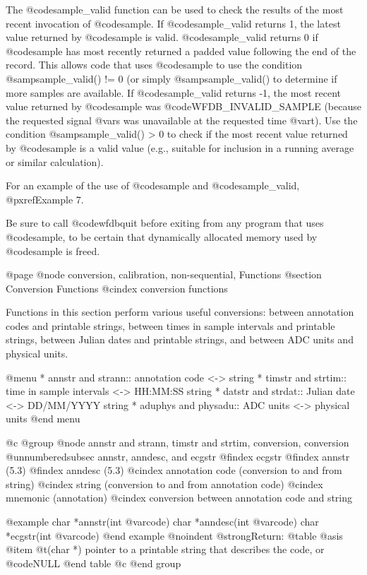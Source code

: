 {{{{{{{{{The @code{sample_valid} function can be used to check the results of the most
recent invocation of @code{sample}.  If @code{sample_valid} returns 1, the
latest value returned by @code{sample} is valid.  @code{sample_valid} returns 0
if @code{sample} has most recently returned a padded value following the end of
the record.  This allows code that uses @code{sample} to use the condition
@samp{sample_valid() != 0} (or simply @samp{sample_valid()} to determine if
more samples are available.  If @code{sample_valid} returns -1, the most recent
value returned by @code{sample} was @code{WFDB_INVALID_SAMPLE} (because the
requested signal @var{s} was unavailable at the requested time @var{t}).  Use
the condition @samp{sample_valid() > 0} to check if the most recent value
returned by @code{sample} is a valid value (e.g., suitable for inclusion in a
running average or similar calculation).

For an example of the use of @code{sample} and @code{sample_valid},
@pxref{Example 7}.

Be sure to call @code{wfdbquit} before exiting from any program that
uses @code{sample}, to be certain that dynamically allocated memory
used by @code{sample} is freed.

@page
@node     conversion, calibration, non-sequential, Functions
@section Conversion Functions
@cindex conversion functions

Functions in this section perform various useful conversions:  between
annotation codes and printable strings, between times in sample intervals
and printable strings, between Julian dates and printable strings, and between
ADC units and physical units.

@menu
* annstr and strann::		annotation code <-> string
* timstr and strtim::		time in sample intervals <-> HH:MM:SS string
* datstr and strdat::		Julian date <-> DD/MM/YYYY string
* aduphys and physadu::		ADC units <-> physical units
@end menu

@c @group
@node     annstr and strann, timstr and strtim, conversion, conversion
@unnumberedsubsec annstr, anndesc, and ecgstr
@findex ecgstr
@findex annstr (5.3)
@findex anndesc (5.3)
@cindex annotation code (conversion to and from string)
@cindex string (conversion to and from annotation code)
@cindex mnemonic (annotation)
@cindex conversion between annotation code and string

@example
char *annstr(int @var{code})
char *anndesc(int @var{code})
char *ecgstr(int @var{code})
@end example
@noindent
@strong{Return:}
@table @asis
@item @t{(char *)}
pointer to a printable string that describes the code, or @code{NULL}
@end table
@c @end group

}}}}}}}}}
